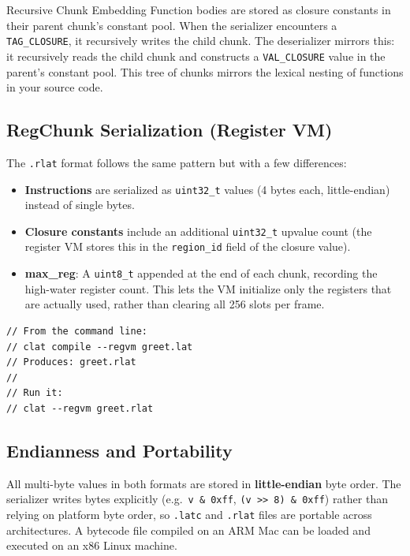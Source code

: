 \begin{notebox}{Recursive Chunk Embedding}
Function bodies are stored as closure constants in their parent chunk's constant pool. When the serializer encounters a \lstinline|TAG_CLOSURE|, it recursively writes the child chunk. The deserializer mirrors this: it recursively reads the child chunk and constructs a \lstinline|VAL_CLOSURE| value in the parent's constant pool. This tree of chunks mirrors the lexical nesting of functions in your source code.
\end{notebox}

\subsection{RegChunk Serialization (Register VM)}

The \lstinline|.rlat| format follows the same pattern but with a few differences:

\begin{itemize}
  \item \textbf{Instructions} are serialized as \lstinline|uint32_t| values (4 bytes each, little-endian) instead of single bytes.
  \item \textbf{Closure constants} include an additional \lstinline|uint32_t| upvalue count (the register VM stores this in the \lstinline|region_id| field of the closure value).
  \item \textbf{max\_reg}: A \lstinline|uint8_t| appended at the end of each chunk, recording the high-water register count. This lets the VM initialize only the registers that are actually used, rather than clearing all 256 slots per frame.
\end{itemize}

\begin{lstlisting}[language=Lattice, caption={Compiling for the register VM}]
// From the command line:
// clat compile --regvm greet.lat
// Produces: greet.rlat
//
// Run it:
// clat --regvm greet.rlat
\end{lstlisting}

\subsection{Endianness and Portability}

All multi-byte values in both formats are stored in \textbf{little-endian} byte order. The serializer writes bytes explicitly (e.g.\ \lstinline|v & 0xff|, \lstinline|(v >> 8) & 0xff|) rather than relying on platform byte order, so \lstinline|.latc| and \lstinline|.rlat| files are portable across architectures. A bytecode file compiled on an ARM Mac can be loaded and executed on an x86 Linux machine.

